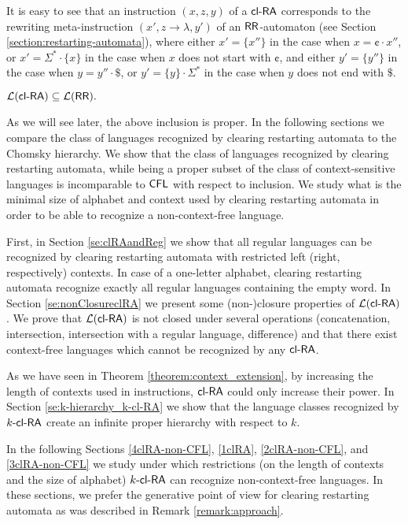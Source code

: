 It is easy to see that an instruction $(x,z,y)$ of a $\clRA$ corresponds to the rewriting meta-instruction $(x',z \to \lambda,y')$ of an $\RR$-automaton (see Section \ref{section:restarting-automata}), where either $x'=\{x''\}$ in the case when $x=\cent \cdot x''$, or $x' = \Sigma^*\cdot \{x\}$ in the case when $x$ does not start with $\cent$, and either $y'=\{y''\}$ in the case when $y=y'' \cdot \$ $, or $y' = \{y\} \cdot \Sigma^* $ in the case when $y$ does not end with $\$ $.

\begin{theorem}\label{theorem:clRAsubseteqRR}
$\calL{\clRA} \subseteq \calL{\RR}.$
\end{theorem}

As we will see later, the above inclusion is proper. In the following sections we compare the class of languages recognized by clearing restarting automata to the Chomsky hierarchy. We show that the class of languages recognized by clearing restarting automata, while being a proper subset of the class of context-sensitive languages is incomparable to $\CFL$ with respect to inclusion. We study what is the minimal size of alphabet and context used by clearing restarting automata in order to be able to recognize a non-context-free language.

First, in Section \ref{se:clRAandReg} we show that all regular languages can be recognized by clearing restarting automata with restricted left (right, respectively) contexts. In case of a one-letter alphabet, clearing restarting automata recognize exactly all regular languages containing the empty word. In Section \ref{se:nonClosureclRA} we present some (non-)closure properties of $\calL{\clRA}$. We prove that $\calL{\clRA}$ is not closed under several operations (concatenation, intersection, intersection with a regular language, difference) and that there exist context-free languages which cannot be recognized by any $\clRA$.

As we have seen in Theorem \ref{theorem:context_extension}, by increasing the length of contexts used in instructions, $\clRA$ could only increase their power. In Section \ref{se:k-hierarchy_k-cl-RA} we show that the language classes recognized by \index{$\kclRA$}$\kclRA[k]$ create an infinite proper hierarchy with respect to $k$.

In the following Sections \ref{4clRA-non-CFL}, \ref{1clRA}, \ref{2clRA-non-CFL}, and \ref{3clRA-non-CFL} we study under which restrictions (on the length of contexts and the size of alphabet) $\kclRA[k]$ can recognize non-context-free languages. In these sections, we prefer the generative point of view for clearing restarting automata as was described in Remark \ref{remark:approach}.

